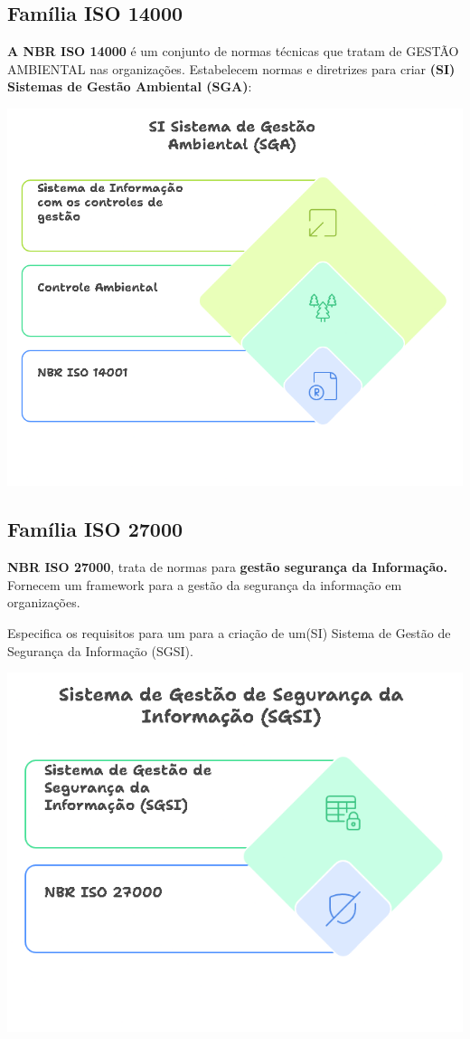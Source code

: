 \documentclass[
]{book}
\begin{document}
\subsection{Família ISO 14000}\label{famuxedlia-iso-14000}

\textbf{A NBR ISO 14000} é um conjunto de normas técnicas que tratam de GESTÃO AMBIENTAL nas organizações. Estabelecem normas e diretrizes para criar \textbf{(SI) Sistemas de Gestão Ambiental (SGA)}:

\includegraphics{images/qualidade-geral/ISO-14000-SGQ.png}

\subsection{Família ISO 27000}\label{famuxedlia-iso-27000}

\textbf{NBR ISO 27000}, trata de normas para \textbf{gestão segurança da Informação.} Fornecem um framework para a gestão da segurança da informação em organizações.

Especifica os requisitos para um para a criação de um(SI) Sistema de Gestão de Segurança da Informação (SGSI).

\includegraphics{images/qualidade-geral/ISO-27000-SGSI.png}
\end{document}
